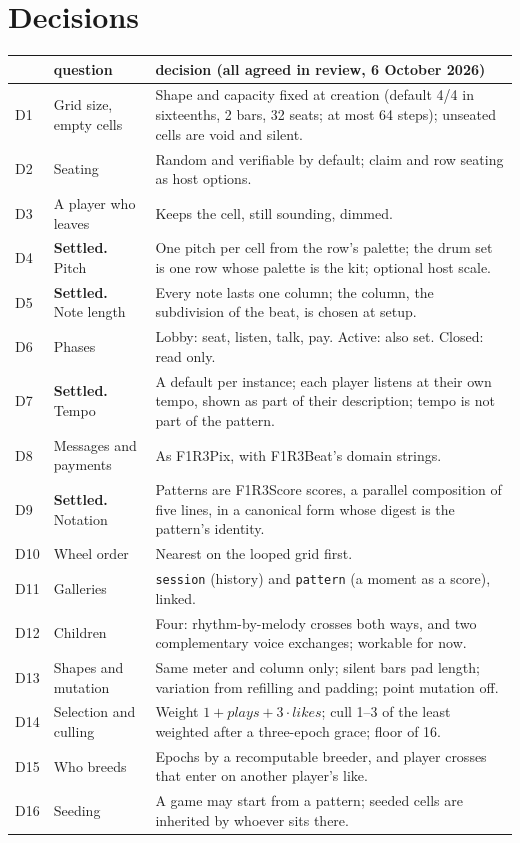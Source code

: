 \documentclass[11pt,a4paper]{article}
\newcommand{\code}[1]{\texttt{#1}}
\begin{document}
\section{Decisions}\label{sec:decisions}

\begin{center}\small
\begin{tabularx}{\linewidth}{@{}l>{\raggedright\arraybackslash}p{38mm}X@{}}
\toprule
 & question & decision (all agreed in review, 6 October 2026)\\
\midrule
D1 & Grid size, empty cells & Shape and capacity fixed at creation (default 4/4 in sixteenths, 2 bars, 32 seats; at most 64 steps); unseated cells are void and silent.\\
D2 & Seating & Random and verifiable by default; claim and row seating as host options.\\
D3 & A player who leaves & Keeps the cell, still sounding, dimmed.\\
D4 & \textbf{Settled.} Pitch & One pitch per cell from the row's palette; the drum set is one row whose palette is the kit; optional host scale.\\
D5 & \textbf{Settled.} Note length & Every note lasts one column; the column, the subdivision of the beat, is chosen at setup.\\
D6 & Phases & Lobby: seat, listen, talk, pay. Active: also set. Closed: read only.\\
D7 & \textbf{Settled.} Tempo & A default per instance; each player listens at their own tempo, shown as part of their description; tempo is not part of the pattern.\\
D8 & Messages and payments & As F1R3Pix, with F1R3Beat's domain strings.\\
D9 & \textbf{Settled.} Notation & Patterns are F1R3Score scores, a parallel composition of five lines, in a canonical form whose digest is the pattern's identity.\\
D10 & Wheel order & Nearest on the looped grid first.\\
D11 & Galleries & \code{session} (history) and \code{pattern} (a moment as a score), linked.\\
D12 & Children & Four: rhythm-by-melody crosses both ways, and two complementary voice exchanges; workable for now.\\
D13 & Shapes and mutation & Same meter and column only; silent bars pad length; variation from refilling and padding; point mutation off.\\
D14 & Selection and culling & Weight $1+\mathit{plays}+3\cdot\mathit{likes}$; cull 1--3 of the least weighted after a three-epoch grace; floor of 16.\\
D15 & Who breeds & Epochs by a recomputable breeder, and player crosses that enter on another player's like.\\
D16 & Seeding & A game may start from a pattern; seeded cells are inherited by whoever sits there.\\
\bottomrule
\end{tabularx}
\end{center}
\end{document}
